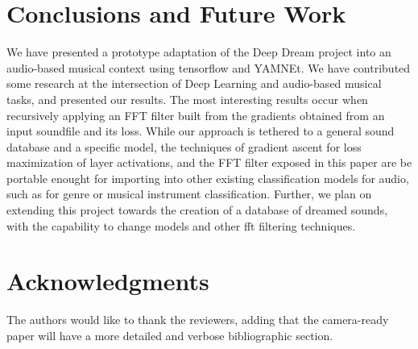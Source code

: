 \documentclass[a4paper,10pt,oneside]{article}
\begin{document}
\begin{sloppy}
\section{Conclusions and Future Work}
We have presented a prototype adaptation of the Deep Dream project into an audio-based musical context using tensorflow and YAMNEt. We have contributed some research at the intersection of Deep Learning and audio-based musical tasks, and presented our results. The most interesting results occur when recursively applying an FFT filter built from the gradients obtained from an input soundfile and its loss. While our approach is tethered to a general sound database and a specific model, the techniques of gradient ascent for loss maximization of layer activations, and the FFT filter exposed in this paper are be portable enought for importing into other existing classification models for audio, such as for genre or musical instrument classification. Further, we plan on extending this project towards the creation of a database of dreamed sounds, with the capability to change models and other fft filtering techniques.

\section{Acknowledgments}
The authors would like to thank the reviewers, adding that the camera-ready paper will have a more detailed and verbose bibliographic section.


%
% 
%
% 

\end{sloppy}
\end{document}
